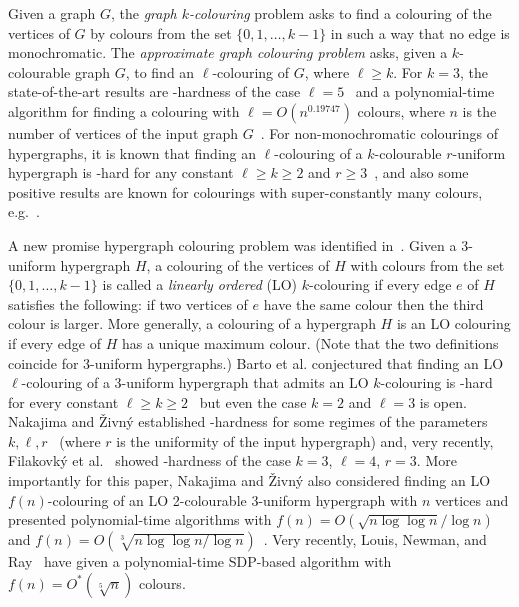 \documentclass[a4paper,11pt]{article}
\theoremstyle{plain}
\theoremstyle{definition}
\begin{document}
Given a graph $G$, the \emph{graph $k$-colouring} problem asks
to find a colouring of the vertices of $G$ by colours from the set
$\{0,1,\ldots,k-1\}$ in such a way that no edge is monochromatic. 
%
The \emph{approximate graph colouring problem} asks, given a $k$-colourable
graph $G$, to find an $\ell$-colouring of $G$, where $\ell\geq k$. For $k=3$, the
state-of-the-art results are \NP-hardness of the case $\ell=5$~\cite{BBKO21} and
a polynomial-time algorithm for finding a colouring with $\ell=O(n^{0.19747})$ colours,
where $n$ is the number of vertices of the input graph $G$~\cite{KTY24:stoc}.
%
For non-monochromatic colourings of hypergraphs, it is known that finding an
$\ell$-colouring of a $k$-colourable $r$-uniform hypergraph is \NP-hard for any
constant $\ell\geq k\geq 2$ and $r\geq 3$~\cite{DRS05}, 
and also some positive results are known for colourings with
super-constantly many colours,
e.g.~\cite{Krivelevich03:ja,Krivelevich01:ja,Chlamtac08:approx}.

A new promise hypergraph colouring problem was identified
in~\cite{Barto21:stacs}.
%
Given a 3-uniform hypergraph $H$, a colouring of the
vertices of $H$ with colours from the set $\{0,1,\ldots,k-1\}$ is called
a \emph{linearly ordered} (LO) $k$-colouring if every edge $e$ of $H$ satisfies the following: if two vertices of $e$ have the same colour then the third colour is
larger. More generally, a colouring of a hypergraph $H$ is an LO
colouring if every edge of $H$ has a unique maximum colour. (Note that the
two definitions coincide for 3-uniform hypergraphs.)
%
Barto et al. conjectured that finding an LO
$\ell$-colouring of a 3-uniform hypergraph that admits an LO $k$-colouring is
\NP-hard for every constant $\ell\geq k\geq 2$~\cite{Barto21:stacs} but even the
case $k=2$ and $\ell=3$ is open. Nakajima and \v{Z}ivn\'y established
\NP-hardness for some regimes of the parameters $k,\ell,
r$~\cite{NZ22:icalp,NZ23:toct}  (where $r$ is the uniformity of the input hypergraph) and, very recently, Filakovk\'y et al.~\cite{fnotw24:stacs} showed \NP-hardness of
the case $k=3$, $\ell=4$, $r=3$.
%
More importantly for this paper, Nakajima and \v{Z}ivn\'y also considered
finding an LO $f(n)$-colouring of an LO 2-colourable 3-uniform hypergraph
with $n$ vertices and presented polynomial-time algorithms with
$f(n)=O(\sqrt{n \log \log n}/\log n)$~\cite{NZ22:icalp}
and
$f(n)=O(\sqrt[3]{n \log \log n / \log n})$~\cite{NZ23:toct}.
%
Very recently, Louis, Newman, and Ray~\cite{LNR24:arxiv} have given a
polynomial-time SDP-based algorithm with $f(n)=O^*(\sqrt[5]{n})$ colours.
\end{document}
